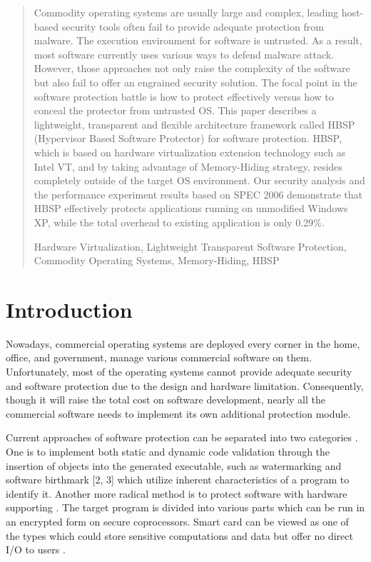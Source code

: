 \documentclass[conference]{IEEEtran}
\begin{document}
\begin{abstract}
Commodity operating systems are usually large and complex, leading
host-based security tools often fail to provide adequate
protection from malware. The execution environment for software is
untrusted. As a result, most software currently uses various ways
to defend malware attack. However, those approaches not only raise
the complexity of the software but also fail to offer an engrained
security solution. The focal point in the software protection
battle is how to protect effectively versus how to conceal the
protector from untrusted OS. This paper describes a lightweight,
transparent and flexible architecture framework called HBSP
(Hypervisor Based Software Protector) for software protection.
HBSP, which is based on hardware virtualization extension
technology such as Intel VT, and by taking advantage of
Memory-Hiding strategy, resides completely outside of the target
OS environment.  Our security analysis and the performance
experiment results based on SPEC 2006 demonstrate that HBSP
effectively protects applications running on unmodified Windows
XP, while the total overhead to existing application is only
0.29\%.

\bigskip

\begin{IEEEkeywords}
Hardware Virtualization, Lightweight Transparent Software
Protection, Commodity Operating Systems, Memory-Hiding, HBSP
\end{IEEEkeywords}

\end{abstract}

\IEEEpeerreviewmaketitle

\bigskip

\section{Introduction}


Nowadays, commercial operating systems are deployed every corner
in the home, office, and government, manage various commercial
software on them. Unfortunately, most of the operating systems
cannot provide adequate security and software protection due to
the design and hardware limitation. Consequently, though it will
raise the total cost on software development, nearly all the
commercial software needs to implement its own additional
protection module.

Current approaches of software protection can be separated into
two categories \cite{IEEEhowto:1}. One is to implement both static
and dynamic code validation through the insertion of objects into
the generated executable, such as watermarking and software
birthmark [2, 3] which utilize inherent characteristics of a
program to identify it. Another more radical method is to protect
software with hardware supporting \cite{IEEEhowto:20}. The target
program is divided into various parts which can be run in an
encrypted form on secure coprocessors. Smart card can be viewed as
one of the types which could store sensitive computations and data
but offer no direct I/O to users \cite{IEEEhowto:4}.
\end{document}
